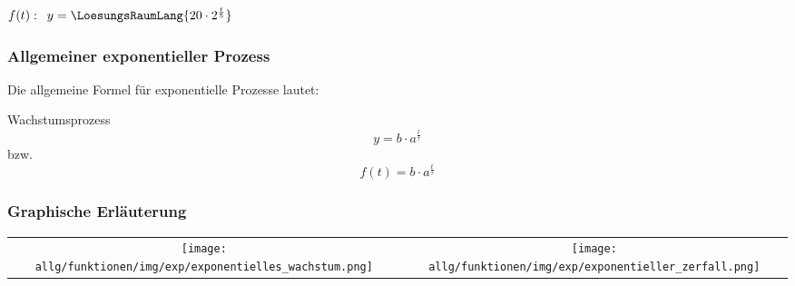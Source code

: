 
\leserluft
\begin{center}
  $f(t):\,\,\, y=\LoesungsRaumLang{20\cdot{} 2 ^{\frac{t}{5}}}$
  \end{center}


\subsubsection{Allgemeiner exponentieller
  Prozess}

Die allgemeine Formel für exponentielle Prozesse lautet:

\begin{definition}{Wachstumsprozess}{}
  $$y = b\cdot{}a^{\frac{t}{\tau}}$$
  bzw.
  $$f(t) = b\cdot{}a^{\frac{t}{\tau}}$$
  
\end{definition}


\newpage

\subsubsection{Graphische Erläuterung}


\begin{tabular}{cc}%
  \texttt{[image: allg/funktionen/img/exp/exponentielles\_wachstum.png]} &
  \texttt{[image: allg/funktionen/img/exp/exponentieller\_zerfall.png]}\\
\end{tabular}


